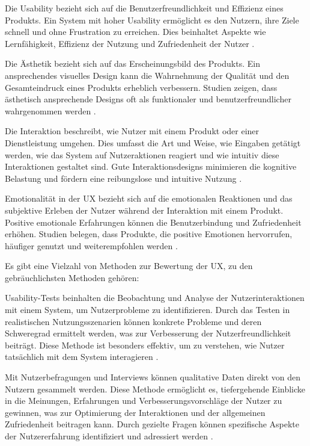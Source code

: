 Die Usability bezieht sich auf die Benutzerfreundlichkeit und Effizienz eines Produkts. 
Ein System mit hoher Usability ermöglicht es den Nutzern, ihre Ziele schnell und ohne Frustration zu erreichen. 
Dies beinhaltet Aspekte wie Lernfähigkeit, Effizienz der Nutzung und Zufriedenheit der Nutzer \cite[S.23 ff.]{Nielsen}.

Die Ästhetik bezieht sich auf das Erscheinungsbild des Produkts. 
Ein ansprechendes visuelles Design kann die Wahrnehmung der Qualität und den Gesamteindruck eines Produkts erheblich verbessern. 
Studien zeigen, dass ästhetisch ansprechende Designs oft als funktionaler und benutzerfreundlicher wahrgenommen werden \cite{Tractinsky}.

Die Interaktion beschreibt, wie Nutzer mit einem Produkt oder einer Dienstleistung umgehen. 
Dies umfasst die Art und Weise, wie Eingaben getätigt werden, wie das System auf Nutzeraktionen reagiert und wie intuitiv diese Interaktionen gestaltet sind. 
Gute Interaktionsdesigns minimieren die kognitive Belastung und fördern eine reibungslose und intuitive Nutzung \cite{interaction_design}.

Emotionalität in der UX bezieht sich auf die emotionalen Reaktionen und das subjektive Erleben der Nutzer während der Interaktion mit einem Produkt. 
Positive emotionale Erfahrungen können die Benutzerbindung und Zufriedenheit erhöhen. 
Studien belegen, dass Produkte, die positive Emotionen hervorrufen, häufiger genutzt und weiterempfohlen werden \cite{emotion}.

Es gibt eine Vielzahl von Methoden zur Bewertung der UX, zu den gebräuchlichsten Methoden gehören:

Usability-Tests beinhalten die Beobachtung und Analyse der Nutzerinteraktionen mit einem System, um Nutzerprobleme zu identifizieren. 
Durch das Testen in realistischen Nutzungsszenarien können konkrete Probleme und deren Schweregrad ermittelt werden, was zur Verbesserung der Nutzerfreundlichkeit beiträgt. 
Diese Methode ist besonders effektiv, um zu verstehen, wie Nutzer tatsächlich mit dem System interagieren \cite[S.165 ff.]{Nielsen}.

Mit Nutzerbefragungen und Interviews können qualitative Daten direkt von den Nutzern gesammelt werden. 
Diese Methode ermöglicht es, tiefergehende Einblicke in die Meinungen, Erfahrungen und Verbesserungsvorschläge der Nutzer zu gewinnen, was zur Optimierung der Interaktionen und der allgemeinen Zufriedenheit beitragen kann. 
Durch gezielte Fragen können spezifische Aspekte der Nutzererfahrung identifiziert und adressiert werden \cite{ux_bewertung_interview}.

